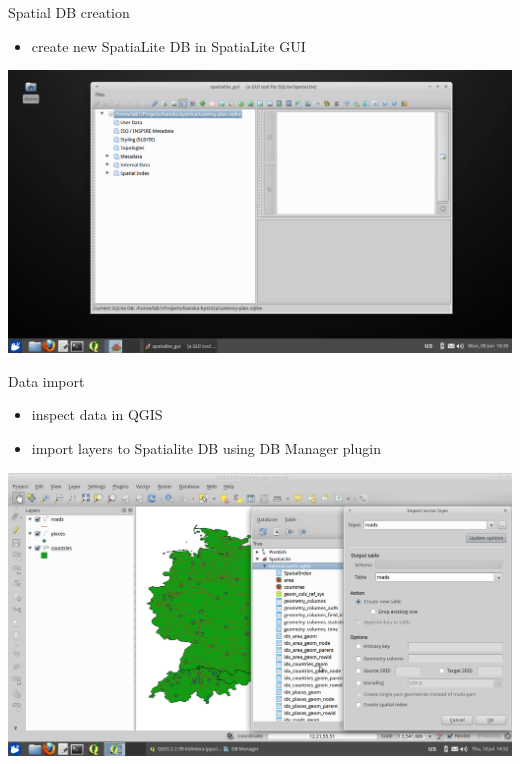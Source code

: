\documentclass[12pt]{beamer}
\begin{document}
\begin{frame}{Spatial DB creation}
	\begin{itemize}
		\item create new SpatiaLite DB in SpatiaLite GUI
	\end{itemize}
	\begin{center}
		\includegraphics[keepaspectratio=true,height=0.7\textheight]{images/real-world-example/project-create-db.png}
	\end{center}
\end{frame}


\begin{frame}{Data import}
	\begin{itemize}
		\item inspect data in QGIS
		\item import layers to Spatialite DB using DB Manager plugin
	\end{itemize}
	\begin{center}
		\includegraphics[keepaspectratio=true,height=0.6\textheight]{images/rapid-gis-deployment/project-db-import-layers.png}
	\end{center}
\end{frame}
\end{document}
